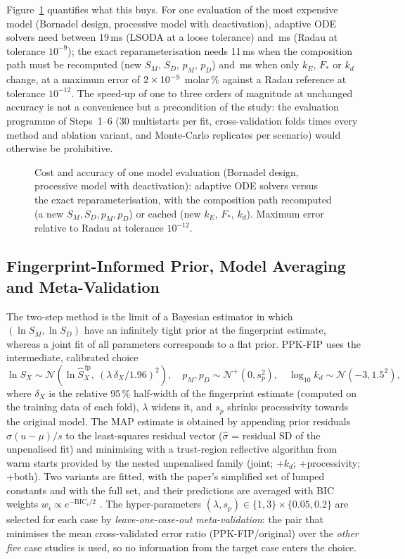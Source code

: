 Figure~\ref{fig:bench} quantifies what this buys. For one evaluation of the most expensive model (Bornadel design, processive model with deactivation), adaptive ODE solvers need between 19\,ms (LSODA at a loose tolerance) and \SolverRadauMs\,ms (Radau at tolerance $10^{-9}$); the exact reparameterisation needs 11\,ms when the composition path must be recomputed (new $S_M$, $S_D$, $p_M$, $p_D$) and \SolverCachedMs\,ms when only $k_E$, $F_\ast$ or $k_d$ change, at a maximum error of $2\times10^{-5}$ molar\,\% against a Radau reference at tolerance $10^{-12}$. The speed-up of one to three orders of magnitude at unchanged accuracy is not a convenience but a precondition of the study: the evaluation programme of Steps~1--6 (30 multistarts per fit, \NLotoFolds{} cross-validation folds times every method and ablation variant, and \NSimReps{} Monte-Carlo replicates per scenario) would otherwise be prohibitive.
\begin{figure}[!htbp]\centering{}\caption{Cost and accuracy of one model evaluation (Bornadel design, processive model with deactivation): adaptive ODE solvers versus the exact reparameterisation, with the composition path recomputed (a new $S_M,S_D,p_M,p_D$) or cached (new $k_E$, $F_\ast$, $k_d$). Maximum error relative to Radau at tolerance $10^{-12}$.}\label{fig:bench}\end{figure}

\subsection{Fingerprint-Informed Prior, Model Averaging and Meta-Validation}
The two-step method is the limit of a Bayesian estimator in which $(\ln S_M,\ln S_D)$ have an infinitely tight prior at the fingerprint estimate, whereas a joint fit of all parameters corresponds to a flat prior. PPK-FIP uses the intermediate, calibrated choice
\begin{equation}
\ln S_X\sim\mathcal N\!\left(\ln\hat S_X^{\,\mathrm{fp}},\ (\lambda\,\delta_X/1.96)^2\right),\quad p_M,p_D\sim\mathcal N^+(0,s_p^2),\quad \log_{10}k_d\sim\mathcal N(-3,1.5^2),\label{eq:prior}
\end{equation}
where $\delta_X$ is the relative 95\,\% half-width of the fingerprint estimate (computed on the training data of each fold), $\lambda$ widens it, and $s_p$ shrinks processivity towards the original model. The MAP estimate is obtained by appending prior residuals $\hat\sigma(u-\mu)/s$ to the least-squares residual vector ($\hat\sigma$ = residual SD of the unpenalised fit) and minimising with a trust-region reflective algorithm from warm starts provided by the nested unpenalised family (joint; +$k_d$; +processivity; +both). Two variants are fitted, with the paper's simplified set of lumped constants and with the full set, and their predictions are averaged with BIC weights $w_i\propto e^{-\mathrm{BIC}_i/2}$ \cite{hoeting1999,burnham2002}. The hyper-parameters $(\lambda,s_p)\in\{1,3\}\times\{0.05,0.2\}$ are selected for each case by \emph{leave-one-case-out meta-validation}: the pair that minimises the mean cross-validated error ratio (PPK-FIP/original) over the \emph{other five} case studies is used, so no information from the target case enters the choice.

